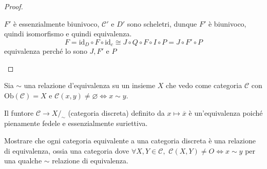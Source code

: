 \begin{proof}
\begin{itemize}
    \(F'\) è essenzialmente biunivoco, \(\mathcal{C}'\) e \(D'\) sono scheletri, dunque \(F'\) è biunivoco, quindi isomorfismo e quindi equivalenza.
    \[
        F = \mathrm{id}_D \circ F \circ \mathrm{id}_c \cong J \circ Q \circ F
        \circ I \circ P = J \circ F' \circ P
    \]
    equivalenza perché lo sono \(J, F'\) e \(P\) 
\end{itemize}
\end{proof}

\begin{example}{}
    Sia \(\sim \) una relazione d'equivalenza su un insieme \(X\) che vedo come
    categoria \(\mathcal{C}\) con \(\mathrm{Ob}{(\mathcal{C})} = X\)  e \(\mathcal{C}{(x,y)} \neq \varnothing \iff x \sim y\).

    Il funtore \(\mathcal{C} \to X/_\sim\) (categoria discreta) definito da \(x \mapsto
    \overline{x}\) è un'equivalenza poiché pienamente fedele e essenzialmente
    suriettiva.
\end{example}

\begin{eser}{}
    Mostrare che ogni categoria equivalente a una categoria discreta è una relazione di
    equivalenza, ossia una categoria dove \(\forall X, Y \in \mathcal{C}, \,\,
    \mathcal{C}{(X,Y)} \neq O \iff x \sim y \) per una qualche \(\sim \) relazione di
    equivalenza.
\end{eser}

